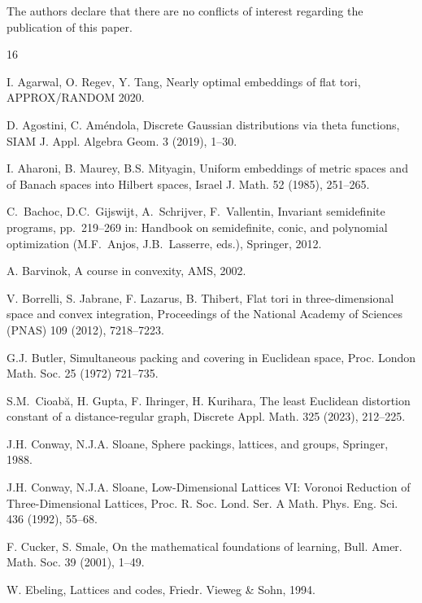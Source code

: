 \documentclass{amsart}
\begin{document}
The authors declare that there are no conflicts of interest regarding the publication of this paper.

%
%
%

\begin{thebibliography}{16}

  I. Agarwal, O. Regev, Y. Tang,
  Nearly optimal embeddings of flat tori,
  APPROX/RANDOM 2020.

D. Agostini, C. Am\'endola,
Discrete Gaussian distributions via theta functions,
SIAM J. Appl. Algebra Geom. 3 (2019), 1--30.

I. Aharoni, B. Maurey, B.S. Mityagin, Uniform embeddings of metric
spaces and of Banach spaces into Hilbert spaces, Israel J. Math. 52
(1985), 251--265.

C.~Bachoc, D.C.~Gijswijt, A.~Schrijver, F.~Vallentin, Invariant
semidefinite programs, pp.~219--269 in: Handbook on semidefinite, conic, and
polynomial optimization (M.F.~Anjos, J.B.~Lasserre, eds.),
Springer, 2012.

A. Barvinok,
A course in convexity,
AMS, 2002.

  V. Borrelli, S. Jabrane, F. Lazarus, B. Thibert,
  Flat tori in three-dimensional space and convex integration,
  Proceedings of the National Academy of Sciences (PNAS)
  109 (2012), 7218--7223.

  G.J. Butler,
 Simultaneous packing and covering in Euclidean space,
  Proc. London Math. Soc. 25 (1972) 721--735.

  S.M.~Cioab\u{a}, H. Gupta, F. Ihringer, H. Kurihara,
  The least Euclidean distortion constant of a distance-regular graph,
  Discrete Appl. Math. 325 (2023), 212--225.

J.H. Conway, N.J.A. Sloane, Sphere packings, lattices, and groups,
Springer, 1988.

J.H. Conway, N.J.A. Sloane, Low-Dimensional Lattices VI: Voronoi Reduction of Three-Dimensional Lattices, Proc. R. Soc. Lond. Ser. A Math. Phys. Eng. Sci.
436 (1992), 55--68.

F. Cucker, S. Smale,
On the mathematical foundations of learning,
Bull. Amer. Math. Soc. 39 (2001), 1--49.

  W. Ebeling,
  Lattices and codes,
Friedr. Vieweg \& Sohn, 1994.


\end{thebibliography}
\end{document}
